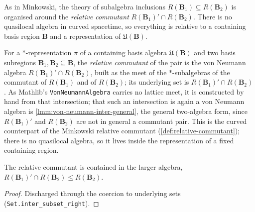 As in Minkowski, the theory of subalgebra inclusions $R(\mathbf{B}_1) \subseteq R(\mathbf{B}_2)$ is organised around the \emph{relative commutant} $R(\mathbf{B}_1)' \cap R(\mathbf{B}_2)$. There is no quasilocal algebra in curved spacetime, so everything is relative to a containing basis region $\mathbf{B}$ and a representation of $\mathfrak{U}(\mathbf{B})$.

\begin{definition}
    \label{def:relative-commutant-in-curved-spacetime}
    \leanok
    For a $*$-representation $\pi$ of a containing basis algebra $\mathfrak{U}(\mathbf{B})$ and two basis subregions $\mathbf{B}_1, \mathbf{B}_2 \subseteq \mathbf{B}$, the \emph{relative commutant} of the pair is the von Neumann algebra $R(\mathbf{B}_1)' \cap R(\mathbf{B}_2)$, built as the meet of the $*$-subalgebras of the commutant of $R(\mathbf{B}_1)$ and of $R(\mathbf{B}_2)$; its underlying set is $R(\mathbf{B}_1)' \cap R(\mathbf{B}_2)$. As Mathlib's \texttt{VonNeumannAlgebra} carries no lattice meet, it is constructed by hand from that intersection; that such an intersection is again a von Neumann algebra is \ref{lmm:von-neumann-inter-general}, the general two-algebra form, since $R(\mathbf{B}_1)'$ and $R(\mathbf{B}_2)$ are not in general a commutant pair. This is the curved counterpart of the Minkowski relative commutant (\ref{def:relative-commutant}); there is no quasilocal algebra, so it lives inside the representation of a fixed containing region.
\end{definition}

\begin{theorem}
    \label{thrm:relative-commutant-le-right-in-curved-spacetime}
    \leanok
    The relative commutant is contained in the larger algebra, $R(\mathbf{B}_1)' \cap R(\mathbf{B}_2) \le R(\mathbf{B}_2)$.
\end{theorem}
\begin{proof}
    \leanok
    Discharged through the coercion to underlying sets (\texttt{Set.inter\_subset\_right}).
\end{proof}


